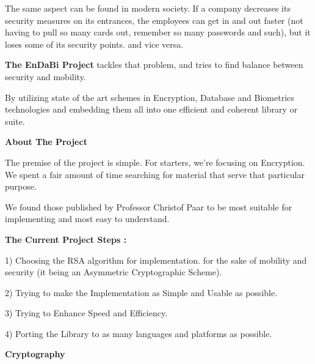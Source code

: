 \documentclass{slides}
\begin{document}
\begin{center}
The same aspect can be found in modern society.
If a company decreases its security measures on its entrances, the employees can get in and out faster (not having to pull so many cards out, remember so many passwords and such), but it loses some of its security points. and vice versa.
\end{center}
\begin{center}
\textbf{The EnDaBi Project} tackles that problem, and tries to find balance between security and mobility.
\end{center}
\begin{center}
By utilizing state of the art schemes in Encryption, Database and Biometrics technologies and embedding them all into one efficient and coherent library or suite. 
\end{center}
\begin{titlepage}
\begin{center}
\textbf{\Large About The Project}\end{center}
\begin{center}
The premise of the project is simple.
For starters, we're focusing on Encryption.
We spent a fair amount of time searching for material that serve that particular purpose.
\end{center}
\begin{center} We found those published by Professor Christof Paar to be most suitable for implementing and most easy to understand.
\end{center}
\newpage
\begin{center}
\textbf{\Large The Current Project Steps :}
\end{center}
\begin{center}
1) Choosing the RSA algorithm for implementation. for the sake of mobility and security (it being an Asymmetric Cryptographic Scheme).
\end{center}
\begin{center}
2) Trying to make the Implementation as Simple and Usable as possible.
\end{center}
\begin{center}
3) Trying to Enhance Speed and Efficiency.
\end{center}
\begin{center}
4) Porting the Library to as many languages and platforms as possible.
\end{center}
\end{titlepage}
\newpage
\begin{center}
\textbf{\Large Cryptography}
\end{center}
\end{document}
